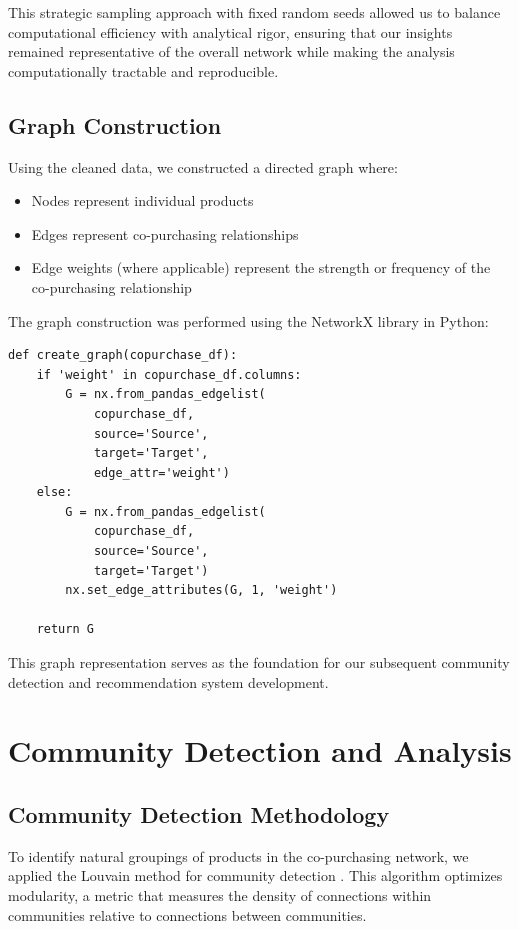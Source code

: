 \documentclass[conference]{IEEEtran}
\begin{document}
This strategic sampling approach with fixed random seeds allowed us to balance computational efficiency with analytical rigor, ensuring that our insights remained representative of the overall network while making the analysis computationally tractable and reproducible.

\subsection{Graph Construction}
Using the cleaned data, we constructed a directed graph where:

\begin{itemize}
    \item Nodes represent individual products
    \item Edges represent co-purchasing relationships
    \item Edge weights (where applicable) represent the strength or frequency of the co-purchasing relationship
\end{itemize}

The graph construction was performed using the NetworkX library in Python:

\begin{lstlisting}
def create_graph(copurchase_df):
    if 'weight' in copurchase_df.columns:
        G = nx.from_pandas_edgelist(
            copurchase_df,
            source='Source', 
            target='Target', 
            edge_attr='weight')
    else:
        G = nx.from_pandas_edgelist(
            copurchase_df,
            source='Source', 
            target='Target')
        nx.set_edge_attributes(G, 1, 'weight')
    
    return G
\end{lstlisting}

This graph representation serves as the foundation for our subsequent community detection and recommendation system development.

\section{Community Detection and Analysis}
\subsection{Community Detection Methodology}
To identify natural groupings of products in the co-purchasing network, we applied the Louvain method for community detection \cite{blondel2008fast}. This algorithm optimizes modularity, a metric that measures the density of connections within communities relative to connections between communities.
\end{document}
